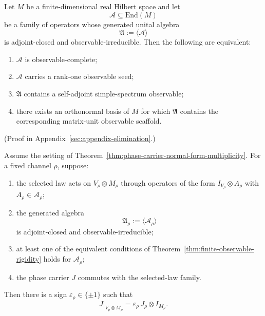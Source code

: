 \begin{theorem}
\label{thm:finite-observable-rigidity}
Let $M$ be a finite-dimensional real Hilbert space and let
\[
\mathcal A\subseteq \mathrm{End}(M)
\]
be a family of operators whose generated unital algebra
\[
\mathfrak A:=\langle\mathcal A\rangle
\]
is adjoint-closed and observable-irreducible. Then the following are
equivalent:
\begin{enumerate}[label=(\roman*), leftmargin=2em, itemsep=0.2em]
\item $\mathcal A$ is observable-complete;
\item $\mathcal A$ carries a rank-one observable seed;
\item $\mathfrak A$ contains a self-adjoint simple-spectrum observable;
\item there exists an orthonormal basis of $M$ for which $\mathfrak A$
      contains the corresponding matrix-unit observable scaffold.
\end{enumerate}
\end{theorem}

(Proof in Appendix~\ref{sec:appendix-elimination}.)

\begin{corollary}
\label{cor:finite-observable-rigidity-phase}
Assume the setting of
Theorem~\ref{thm:phase-carrier-normal-form-multiplicity}. For a fixed channel
$\rho$, suppose:
\begin{enumerate}[label=(\roman*), leftmargin=2em, itemsep=0.2em]
\item the selected law acts on $V_{\rho}\otimes M_{\rho}$ through operators of
      the form $I_{V_{\rho}}\otimes A_{\rho}$ with
      $A_{\rho}\in\mathcal A_{\rho}$;
\item the generated algebra
      \[
      \mathfrak A_{\rho}:=\langle\mathcal A_{\rho}\rangle
      \]
      is adjoint-closed and observable-irreducible;
\item at least one of the equivalent conditions of
      Theorem~\ref{thm:finite-observable-rigidity} holds for
      $\mathcal A_{\rho}$;
\item the phase carrier $J$ commutes with the selected-law family.
\end{enumerate}
Then there is a sign $\varepsilon_{\rho}\in\{\pm1\}$ such that
\[
J|_{V_{\rho}\otimes M_{\rho}}
=
\varepsilon_{\rho}\,J_{\rho}\otimes I_{M_{\rho}}.
\]
\end{corollary}

